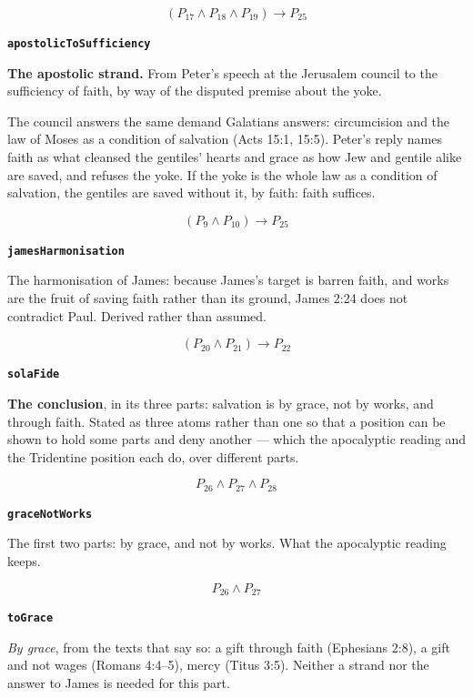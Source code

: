 \documentclass[11pt]{article}
\begin{document}
\[(P_{17} \land P_{18} \land P_{19}) \rightarrow P_{25}\]
\par\medskip\noindent\textbf{\texttt{apostolic\allowbreak{}To\allowbreak{}Sufficiency}}\par\nobreak\noindent
\textbf{The apostolic strand.} From Peter's speech at the Jerusalem council to the sufficiency of faith, by way of the disputed premise about the yoke.

The council answers the same demand Galatians answers: circumcision and the law of Moses as a condition of salvation (Acts 15:1, 15:5). Peter's reply names faith as what cleansed the gentiles' hearts and grace as how Jew and gentile alike are saved, and refuses the yoke. If the yoke is the whole law as a condition of salvation, the gentiles are saved without it, by faith: faith suffices.

\[(P_{9} \land P_{10}) \rightarrow P_{25}\]
\par\medskip\noindent\textbf{\texttt{james\allowbreak{}Harmonisation}}\par\nobreak\noindent
The harmonisation of James: because James's target is barren faith, and works are the fruit of saving faith rather than its ground, James 2:24 does not contradict Paul. Derived rather than assumed.

\[(P_{20} \land P_{21}) \rightarrow P_{22}\]
\par\medskip\noindent\textbf{\texttt{sola\allowbreak{}Fide}}\par\nobreak\noindent
\textbf{The conclusion}, in its three parts: salvation is by grace, not by works, and through faith. Stated as three atoms rather than one so that a position can be shown to hold some parts and deny another — which the apocalyptic reading and the Tridentine position each do, over different parts.

\[P_{26} \land P_{27} \land P_{28}\]
\par\medskip\noindent\textbf{\texttt{grace\allowbreak{}Not\allowbreak{}Works}}\par\nobreak\noindent
The first two parts: by grace, and not by works. What the apocalyptic reading keeps.

\[P_{26} \land P_{27}\]
\par\medskip\noindent\textbf{\texttt{to\allowbreak{}Grace}}\par\nobreak\noindent
\emph{By grace}, from the texts that say so: a gift through faith (Ephesians 2:8), a gift and not wages (Romans 4:4–5), mercy (Titus 3:5). Neither a strand nor the answer to James is needed for this part.
\end{document}
